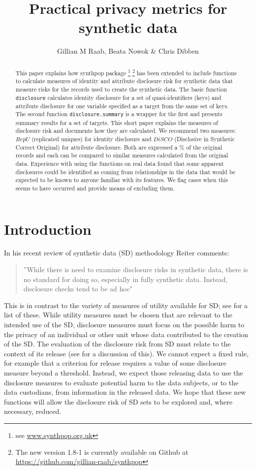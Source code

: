\documentclass[12pt]{article}
\title{Practical privacy metrics for synthetic data}
\author{Gillian M Raab, Beata Nowok \& Chris Dibben}
\renewcommand{\baselinestretch}{1.5} %
\begin{document}



\maketitle
\begin{abstract}
This paper explains how synthpop package \footnote{see \url{www.synthpop.org.uk} } \footnote{The new version 1.8-1 is currently available on Github at \url{https://github.com/gillian-raab/synthpop}} has been extended to include functions to calculate measures of identity and attribute disclosure risk for synthetic data that measure risks for the 
records used to create the synthetic data. The basic function \texttt{disclosure} calculates identity disclosure for a set of quasi-identifiers (keys) and attribute disclosure for one variable specified as a target from the same set of keys. The second function \texttt{disclosure.summary} is a wrapper for the first and presents summary results for a set of targets. This short paper explains the measures of disclosure risk and documents how they are calculated. We recommend two measures: $RepU$ (replicated uniques) for identity
disclosure and $DiSCO$ (Disclosive in Synthetic Correct Original) for attribute disclosure. Both
are expressed a \% of the original records and each can be compared to similar measures calculated from the original data.
Experience with using the functions on real data found that some apparent disclosures could be identified as coming from relationships 
in the data that would be expected to be known to anyone familiar with its features. We flag cases when this seems to have occurred and provide means of excluding them.

\end{abstract}
\section{Introduction}
\renewcommand{\baselinestretch}{1.5} 
In his recent review of synthetic data (SD) methodology Reiter \cite{reiter2023}
comments: 
\begin{quote}
''While there is need to examine disclosure risks in synthetic data, there is no standard for
doing so, especially in fully synthetic data. Instead, disclosure checks tend to be ad hoc"
\end{quote}
This is in contrast to the variety of measures of utility available for SD; see \cite{raab2021} for a list of these. While utility measures must be chosen that are relevant to the intended use of the SD, disclosure measures must focus on the possible harm to the privacy of an individual or other unit whose data contributed to the creation of the SD. The evaluation of the disclosure risk from SD must relate to the context of its release (see \cite{elliotanonframe} for a discussion of this). We cannot expect a fixed rule, for example that a criterion for release requires a value of some disclosure measure beyond a threshold. Instead, we expect those releasing data to use the disclosure measures to evaluate potential harm to the data subjects, or to the data custodians, from information in the released data. We hope that these new functions will allow the disclosure risk of SD sets to be explored and, where necessary, reduced. 
\end{document}
